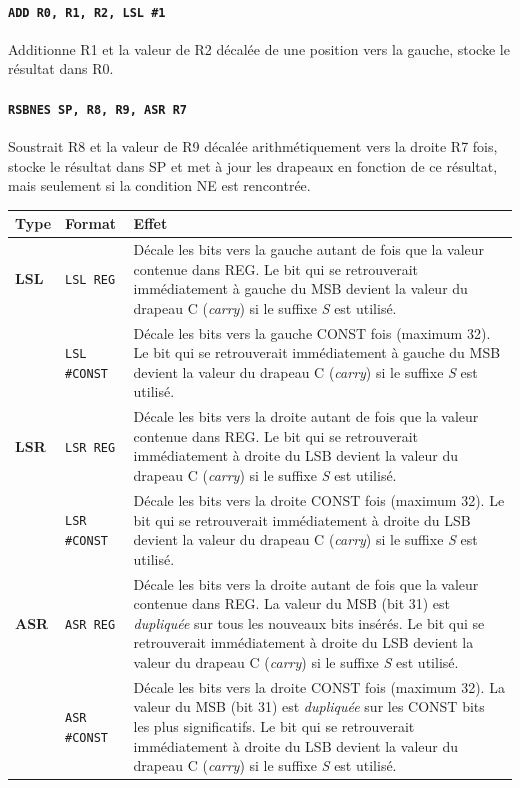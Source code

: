 \documentclass{tufte-handout}
\begin{document}
\paragraph{\texttt{ADD R0, R1, R2, LSL \#1}} Additionne R1 et la valeur de R2 décalée de une position vers la gauche, stocke le résultat dans R0.
\paragraph{\texttt{RSBNES SP, R8, R9, ASR R7}} Soustrait R8 et la valeur de R9 décalée arithmétiquement vers la droite R7 fois, stocke le résultat dans SP et met à jour les drapeaux en fonction de ce résultat, mais seulement si la condition NE est rencontrée.

\begin{table}
\begin{tabular}{l|l|p{13.5cm}}
Type & Format & Effet \\ \hline
\textbf{LSL} & \texttt{LSL REG} & Décale les bits vers la gauche autant de fois que la valeur contenue dans REG. Le bit qui se retrouverait immédiatement à gauche du MSB devient la valeur du drapeau C (\textit{carry}) si le suffixe \textit{S} est utilisé. \\
   & \texttt{LSL \#CONST} & Décale les bits vers la gauche CONST fois (maximum 32). Le bit qui se retrouverait immédiatement à gauche du MSB devient la valeur du drapeau C (\textit{carry}) si le suffixe \textit{S} est utilisé. \\ \hline
   
 \textbf{LSR} & \texttt{LSR REG} & Décale les bits vers la droite autant de fois que la valeur contenue dans REG. Le bit qui se retrouverait immédiatement à droite du LSB devient la valeur du drapeau C (\textit{carry}) si le suffixe \textit{S} est utilisé. \\
   & \texttt{LSR \#CONST} & Décale les bits vers la droite CONST fois (maximum 32). Le bit qui se retrouverait immédiatement à droite du LSB devient la valeur du drapeau C (\textit{carry}) si le suffixe \textit{S} est utilisé. \\ \hline
   
 \textbf{ASR} & \texttt{ASR REG} & Décale les bits vers la droite autant de fois que la valeur contenue dans REG. La valeur du MSB (bit 31) est \textit{dupliquée} sur tous les nouveaux bits insérés. Le bit qui se retrouverait immédiatement à droite du LSB devient la valeur du drapeau C (\textit{carry}) si le suffixe \textit{S} est utilisé. \\
   & \texttt{ASR \#CONST} & Décale les bits vers la droite CONST fois (maximum 32). La valeur du MSB (bit 31) est \textit{dupliquée} sur les CONST bits les plus significatifs. Le bit qui se retrouverait immédiatement à droite du LSB devient la valeur du drapeau C (\textit{carry}) si le suffixe \textit{S} est utilisé. \\ \hline
   

\end{tabular}
\end{table}
\end{document}
